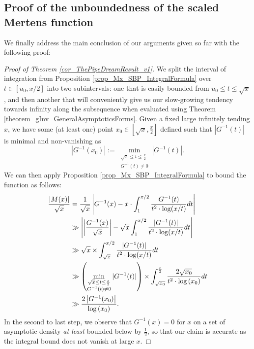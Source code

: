 \documentclass[11pt,reqno,a4letter]{article}
\numberwithin{figure}{section}
\numberwithin{table}{section}
\theoremstyle{plain}
\numberwithin{theorem}{section}
\theoremstyle{definition}
\begin{document}
\subsection{Proof of the unboundedness of the scaled Mertens function}
\label{subSection_TheCoreResultProof} 

We finally address the main conclusion of our arguments given so far with the 
following proof: 

\begin{proof}[Proof of Theorem \ref{cor_ThePipeDreamResult_v1}] 
\label{proofOf_cor_ThePipeDreamResult_v1} 
We split the interval of integration from 
Proposition \ref{prop_Mx_SBP_IntegralFormula} 
over $t \in [u_0, x/2]$ into two subintervals: one that is easily bounded 
from $u_0 \leq t \leq \sqrt{x}$, 
and then another that will conveniently give us our slow-growing tendency towards 
infinity along the subsequence when evaluated using 
Theorem \ref{theorem_gInv_GeneralAsymptoticsForms}. 
Given a fixed large infinitely tending $x$, we have some (at least one) point 
$x_0 \in \left[\sqrt{x}, \frac{x}{2}\right]$ defined such that 
$|G^{-1}(t)|$ is minimal and non-vanishing as 
\[
\left\lvert G^{-1}(x_0) \right\rvert := 
     \min_{\substack{\sqrt{x} \leq t \leq \frac{x}{2} \\ G^{-1}(t) \neq 0}} |G^{-1}(t)|. 
\]
We can then apply Proposition \ref{prop_Mx_SBP_IntegralFormula} to bound the function as 
follows: 
\begin{align} 
\notag 
\frac{|M(x)|}{\sqrt{x}} & = 
     \frac{1}{\sqrt{x}} \left\lvert G^{-1}(x) - x \cdot \int_1^{x/2} \frac{G^{-1}(t)}{ 
     t^2 \cdot \log(x/t)} dt \right\rvert \\ 
\label{eqn_MxGInvxLowerBound_stmt_v0} 
     & \gg 
     \left\lvert \left\lvert \frac{G^{-1}(x)}{\sqrt{x}} \right\rvert - \sqrt{x} 
     \int_1^{x/2} \frac{|G^{-1}(t)|}{ 
     t^2 \cdot \log(x/t)} dt \right\rvert \\ 
\notag 
     & \gg 
     \sqrt{x} \times \int_{\sqrt{x}}^{x/2} \frac{|G^{-1}(t)|}{ 
     t^2 \cdot \log(x/t)} dt \\ 
\notag 
     & \gg \left( 
     \min\limits_{\substack{\sqrt{x} \leq t \leq \frac{x}{2} \\ G^{-1}(t) \neq 0}} |G^{-1}(t)| 
     \right) \times \int_{\sqrt{x_0}}^{\frac{x}{2}} \frac{2 \sqrt{x_0}}{ 
     t^2 \cdot \log\left(x_0\right)} dt \\ 
\label{eqn_MxGInvxLowerBound_stmt_v1} 
     & \gg  
     \frac{2 \left\lvert G^{-1}(x_0) \right\rvert}{\log\left(x_0\right)}. 
\end{align} 
In the second to last step, we observe that $G^{-1}(x) = 0$ for $x$ on a set of 
asymptotic density \emph{at least} bounded below by $\frac{1}{2}$, so that our 
claim is accurate as the integral bound does not vanish at large $x$. 
 

\end{proof}
\end{document}
